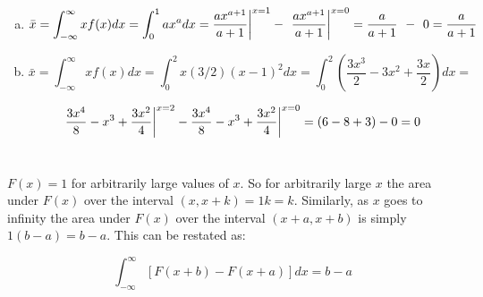 \documentclass{article}
\begin{document}
\begin{enumerate}[(a)]
\item
\[
\bar{x} = \int_{-\infty}^{\infty} xf(x) dx = \int_0^1 ax^a dx =
\frac{ax^{a+1}}{a+1}
\bigg{|}^{x=1} - \hspace{4pt}
\frac{ax^{a+1}}{a+1} \bigg{|}^{x=0} = \frac{a}{a+1} \hspace{4pt}-\hspace{4pt}0 =
\frac{a}{a+1}
\]

\item
\[
\bar{x} = \int_{-\infty}^{\infty} xf(x) dx = \int_0^2 x(3/2)(x-1)^2 dx = 
\int_0^2 \left( \frac{3x^3}{2} - 3x^2 + \frac{3x}{2} \right) dx =
\]

\[
\frac{3x^4}{8} - x^3 + \frac{3x^2}{4} \bigg{|}^{x=2} - 
\frac{3x^4}{8} - x^3 + \frac{3x^2}{4} \bigg{|}^{x=0} = (6 - 8 + 3) - 0 = 0
\]

\end{enumerate}
\section{}
$F(x) = 1$ for arbitrarily large values of $x$. So for arbitrarily large $x$
the area under $F(x)$ over the interval $(x,x+k) = 1k = k$. Similarly,
as $x$ goes to
infinity the area under $F(x)$ over the interval $(x+a, x+b)$ is simply
$1(b-a) = b-a$. This can be restated as:

\[
\int_{-\infty}^{\infty}[F(x+b) - F(x+a)]dx = b - a
\]
\end{document}
